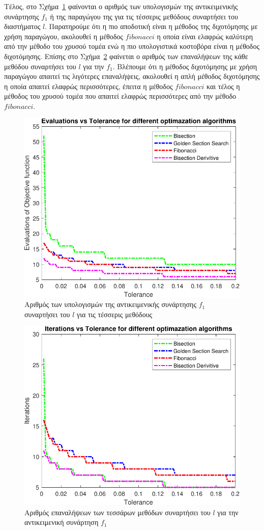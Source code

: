 \documentclass{article}
\begin{document}
Τέλος, στο Σχήμα~\ref{fig:task0_plot1} φαίνονται ο αριθμός των υπολογισμών της αντικειμενικής συνάρτησης $f_1$ ή της
παραγώγου της για τις τέσσερις μεθόδους συναρτήσει του διαστήματος $l$. Παρατηρούμε ότι η πιο αποδοτική είναι η
μέθοδος της διχοτόμησης με χρήση παραγώγου, ακολουθεί η μέθοδος $fibonacci$ η οποία είναι ελαφρώς καλύτερη από
την μέθοδο του χρυσού τομέα ενώ η πιο υπολογιστικά κοστοβόρα είναι η μέθοδος διχοτόμησης. Επίσης στο 
Σχήμα~\ref{fig:task0_plot2} φαίνεται ο αριθμός των επαναλήψεων της κάθε μεθόδου συναρτήσει του $l$ για την $f_1$.
Βλέπουμε ότι η μέθοδος διχοτόμησης με χρήση παραγώγου απαιτεί τις λιγότερες επαναλήψεις, ακολουθεί η απλή 
μέθοδος διχοτόμησης η οποία απαιτεί ελαφρώς περισσότερες, έπειτα η μέθοδος $fibonacci$ και τέλος η μέθοδος του
χρυσού τομέα που απαιτεί ελαφρώς περισσότερες από την μέθοδο $fibonacci$.

\begin{figure}
    \centering
    \includegraphics[width=0.75\linewidth]{plots/task0_plot1.pdf}
    \caption{Aριθμός των υπολογισμών της αντικειμενικής συνάρτησης $f_1$ συναρτήσει του $l$ για τις τέσσερις μεθόδους}
    \label{fig:task0_plot1}
\end{figure}

\begin{figure}
    \centering
    \includegraphics[width=0.75\linewidth]{plots/task0_plot2.pdf}
    \caption{Αριθμός επαναλήψεων των τεσσάρων μεθόδων συναρτήσει του $l$ για την αντικειμενική συνάρτηση $f_1$}
    \label{fig:task0_plot2}
\end{figure}
\end{document}
